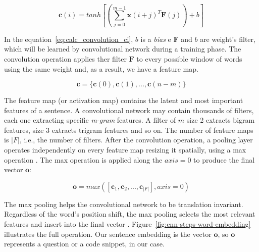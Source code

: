 \documentclass[sigconf]{acmart}
\begin{document}
\begin{equation}\label{eq:calc_convolution_ci}
    \bm{c}(i) = tanh \left[\left(\sum_{j=0}^{m - 1} \bm{x}(i + j)^{T}\bm{F}(j)\right) + b\right]
\end{equation}

In the equation~\ref{eq:calc_convolution_ci}, $b$ is a \textit{bias} e $\bm{F}$ and $b$ are weight's filter, which will be learned by convolutional network during a training phase. The convolution operation applies ther filter $\bm{F}$ to every possible window of words using the same weight and, as a result, we have a feature map.

\begin{equation}
    \bm{c} = \{ \bm{c}(0), \bm{c}(1), . . ., \bm{c}(n - m) \} 
\end{equation}

The feature map (or activation map) contains the latent and most important features of a sentence. A convolutional network may contain thousands of filters, each one extracting specific \emph{m-gram} features. A filter of $m$ size 2 extracts bigram features, size 3 extracts trigram features and so on. The number of feature maps is $|F|$, i.e., the number of filters. After the convolution operation, a pooling layer operates independently on every feature map resizing it spatially, using a max operation \cite{karpathy-course-cnn-2016}.  The max operation is applied along the $axis=0$ to produce the final vector $\bm{o}$:

\begin{equation}
    \bm{o} = max\left(\left[\bm{c}_{1}, \bm{c}_{2}, . . ., \bm{c}_{|F|}\right], axis = 0\right)
\end{equation}

The max pooling helps the convolutional network to be translation invariant. Regardless of the word's position shift, the max pooling selects the most relevant features and insert into the final vector \citep{tom-young:trends-deep-learning-nlp}. Figure~\ref{fig:cnn-steps-word-embedding} illustrates the full operation. Our sentence embedding is the vector $\bm{o}$, so $\bm{o}$ represents a question or a code snippet, in our case. 
\end{document}
